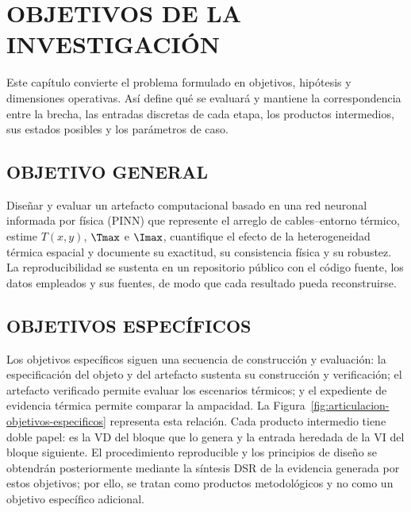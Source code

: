 \chapter{OBJETIVOS DE LA INVESTIGACIÓN}
\thispagestyle{empty}

Este capítulo convierte el problema formulado en objetivos, hipótesis y dimensiones operativas. Así define qué se evaluará y mantiene la correspondencia entre la brecha, las entradas discretas de cada etapa, los productos intermedios, sus estados posibles y los parámetros de caso.

\section{OBJETIVO GENERAL}

Diseñar y evaluar un artefacto computacional basado en una red neuronal informada por física (PINN) que represente el arreglo de cables--entorno térmico, estime $T(x,y)$, $\Tmax$ e $\Imax$, cuantifique el efecto de la heterogeneidad térmica espacial y documente su exactitud, su consistencia física y su robustez. La reproducibilidad se sustenta en un repositorio público con el código fuente, los datos empleados y sus fuentes, de modo que cada resultado pueda reconstruirse.

\section{OBJETIVOS ESPECÍFICOS}

Los objetivos específicos siguen una secuencia de construcción y evaluación: la especificación del objeto y del artefacto sustenta su construcción y verificación; el artefacto verificado permite evaluar los escenarios térmicos; y el expediente de evidencia térmica permite comparar la ampacidad. La Figura~\ref{fig:articulacion-objetivos-especificos} representa esta relación. Cada producto intermedio tiene doble papel: es la VD del bloque que lo genera y la entrada heredada de la VI del bloque siguiente. El procedimiento reproducible y los principios de diseño se obtendrán posteriormente mediante la síntesis DSR de la evidencia generada por estos objetivos; por ello, se tratan como productos metodológicos y no como un objetivo específico adicional.

